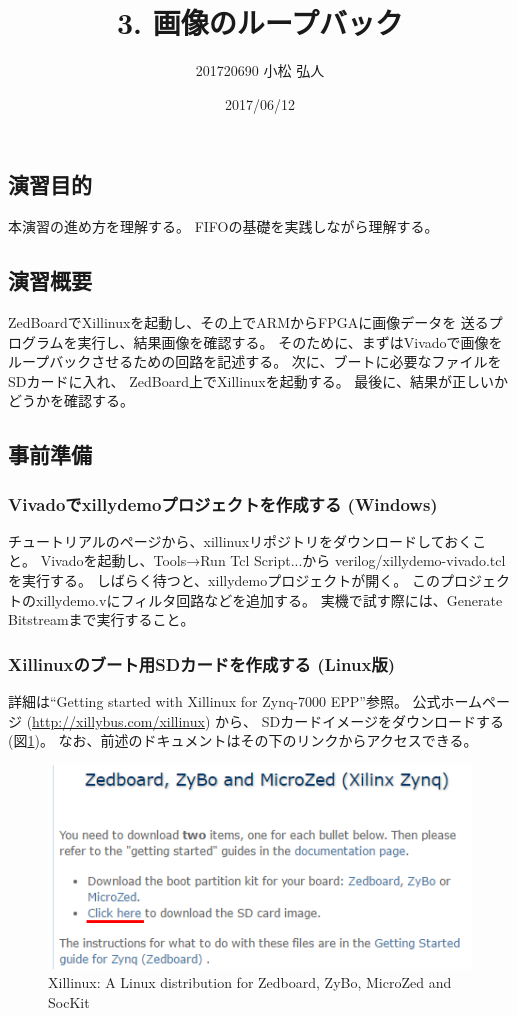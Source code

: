 \documentclass[11pt]{jsarticle}
\title{3. 画像のループバック}
\author{201720690 小松 弘人}
\date{2017/06/12}
\begin{document}
\maketitle
\subsection*{演習目的}
本演習の進め方を理解する。
FIFOの基礎を実践しながら理解する。

\subsection*{演習概要}
ZedBoardでXillinuxを起動し、その上でARMからFPGAに画像データを
送るプログラムを実行し、結果画像を確認する。
そのために、まずはVivadoで画像をループバックさせるための回路を記述する。
次に、ブートに必要なファイルをSDカードに入れ、
ZedBoard上でXillinuxを起動する。
最後に、結果が正しいかどうかを確認する。

\subsection*{事前準備}
\subsubsection*{Vivadoでxillydemoプロジェクトを作成する (Windows)}
チュートリアルのページから、xillinuxリポジトリをダウンロードしておくこと。
Vivadoを起動し、Tools→Run Tcl Script...から
verilog/xillydemo-vivado.tclを実行する。
しばらく待つと、xillydemoプロジェクトが開く。
このプロジェクトのxillydemo.vにフィルタ回路などを追加する。
実機で試す際には、Generate Bitstreamまで実行すること。

\subsubsection*{Xillinuxのブート用SDカードを作成する (Linux版)}
詳細は``Getting started with Xillinux for Zynq-7000 EPP''参照。
公式ホームページ (\url{http://xillybus.com/xillinux}) から、
SDカードイメージをダウンロードする (図\ref{img:xillinux})。
なお、前述のドキュメントはその下のリンクからアクセスできる。

\begin{figure}[ht]
	\centering
	\includegraphics[width=0.5\linewidth]{img/xillinux.PNG}
	\caption{Xillinux: A Linux distribution for Zedboard, ZyBo, MicroZed and SocKit}
	\label{img:xillinux}
\end{figure}
\end{document}

